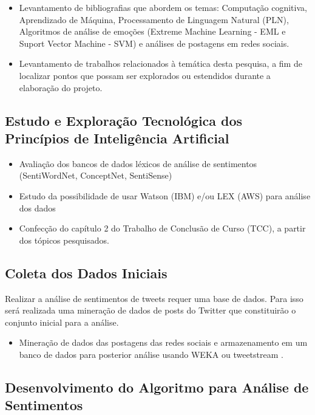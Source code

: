 \documentclass[
	12pt,				%
	openright,			%
	oneside,			%
	a4paper,			%
	english,			%
	spanish,			%
	brazil				%
	]{abntex2}
\begin{document}
				\begin{itemize}
					\item Levantamento de bibliografias que abordem os temas: Computação cognitiva,  Aprendizado de Máquina, Processamento de Linguagem Natural (PLN), Algoritmos de análise de emoções (Extreme Machine Learning - EML e Suport Vector Machine - SVM) e análises de postagens em redes sociais.
					\item Levantamento de trabalhos relacionados à temática desta pesquisa, a fim de localizar pontos que possam ser explorados ou estendidos durante a elaboração do projeto.
					
				\end{itemize}
				
		\subsection*{Estudo e Exploração Tecnológica dos Princípios de Inteligência Artificial }
				
				\begin{itemize} 
					\item Avaliação dos bancos de dados léxicos de análise de sentimentos (SentiWordNet, ConceptNet, SentiSense)
					\item Estudo da possibilidade de usar Watson (IBM) e/ou LEX (AWS) para análise dos dados
					\item Confecção do capítulo 2 do Trabalho de Conclusão de Curso (TCC), a partir dos tópicos pesquisados.
				\end{itemize}			
				
		\subsection*{Coleta dos Dados Iniciais}
		Realizar a análise de sentimentos de tweets requer uma base de dados. Para isso será realizada uma mineração de dados de posts do Twitter que constituirão o conjunto inicial para a análise.
		 
				\begin{itemize}
					\item Mineração de dados das postagens das redes sociais e armazenamento em um banco de dados para posterior análise usando WEKA \cite{article_weka} ou tweetstream \cite{tweetstream}.
				\end{itemize}
				
		\subsection*{Desenvolvimento do Algoritmo para Análise de Sentimentos}				
\end{document}

